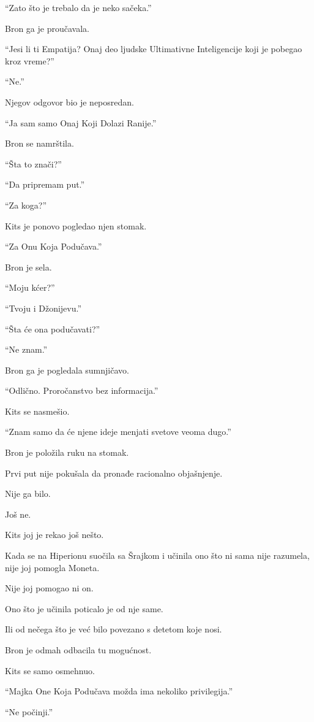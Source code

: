``Zato što je trebalo da je neko sačeka.''

Bron ga je proučavala.

``Jesi li ti Empatija? Onaj deo ljudske Ultimativne Inteligencije koji je pobegao kroz vreme?''

``Ne.''

Njegov odgovor bio je neposredan.

``Ja sam samo Onaj Koji Dolazi Ranije.''

Bron se namrštila.

``Šta to znači?''

``Da pripremam put.''

``Za koga?''

Kits je ponovo pogledao njen stomak.

``Za Onu Koja Podučava.''

\bigskip

Bron je sela.

``Moju kćer?''

``Tvoju i Džonijevu.''

``Šta će ona podučavati?''

``Ne znam.''

Bron ga je pogledala sumnjičavo.

``Odlično. Proročanstvo bez informacija.''

Kits se nasmešio.

``Znam samo da će njene ideje menjati svetove veoma dugo.''

Bron je položila ruku na stomak.

Prvi put nije pokušala da pronađe racionalno objašnjenje.

Nije ga bilo.

Još ne.

\bigskip

Kits joj je rekao još nešto.

Kada se na Hiperionu suočila sa Šrajkom i učinila ono što ni sama nije razumela, nije joj pomogla Moneta.

Nije joj pomogao ni on.

Ono što je učinila poticalo je od nje same.

Ili od nečega što je već bilo povezano s detetom koje nosi.

Bron je odmah odbacila tu mogućnost.

Kits se samo osmehnuo.

``Majka One Koja Podučava možda ima nekoliko privilegija.''

``Ne počinji.''

